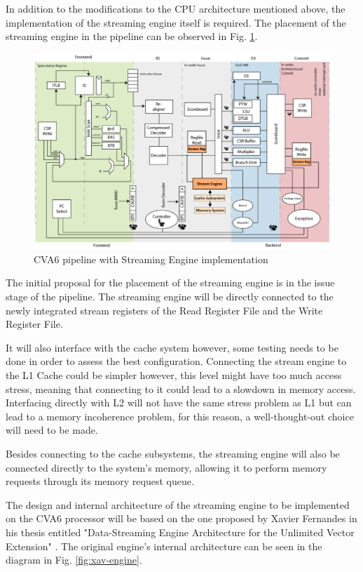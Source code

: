 In addition to the modifications to the CPU architecture mentioned above, the implementation of the streaming engine itself is required. The placement of the streaming engine in the pipeline can be observed in Fig. \ref{fig:cva6-altered-pipeline}.
\begin{figure}[H]
    \centering
    \includegraphics[width=0.75\linewidth]{images/cva6-overview-altered-simplified.png}
    \caption{CVA6 pipeline with Streaming Engine implementation}
    \label{fig:cva6-altered-pipeline}
\end{figure}


The initial proposal for the placement of the streaming engine is in the issue stage of the pipeline. The streaming engine will be directly connected to the newly integrated stream registers of the Read Register File and the Write Register File. 

It will also interface with the cache system however, some testing needs to be done in order to assess the best configuration. Connecting the stream engine to the L1 Cache could be simpler however, this level might have too much access stress, meaning that connecting to it could lead to a slowdown in memory access. Interfacing directly with L2 will not have the same stress problem as L1 but can lead to a memory incoherence problem,  for this reason, a well-thought-out choice will need to be made.

Besides connecting to the cache subsystems, the streaming engine will also be connected directly to the system's memory, allowing it to perform memory requests through its memory request queue.


The design and internal architecture of the streaming engine to be implemented on the CVA6 processor will be based on the one proposed by Xavier Fernandes in his thesis entitled "Data-Streaming Engine Architecture for the Unlimited Vector Extension" \cite{thesis-xf}. The original engine's internal architecture can be seen in the diagram in Fig. \ref{fig:xav-engine}.

